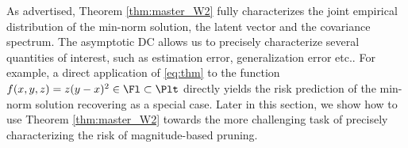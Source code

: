 

%


As advertised, Theorem \ref{thm:master_W2} fully characterizes the joint empirical distribution of the min-norm solution, the latent vector and the covariance spectrum. The asymptotic DC allows us to precisely characterize several quantities of interest, such as estimation error, generalization error etc.. For example, a direct application of \eqref{eq:thm} to the function $f(x,y,z)=z(y-x)^2\in \Fl\subset\Plt$ directly yields the risk prediction of the min-norm solution recovering \cite[Thm.~3]{hastie2019surprises} as a special case. Later in this section, we show how to use Theorem \ref{thm:master_W2} towards the more challenging task of precisely characterizing the risk of magnitude-based pruning.

